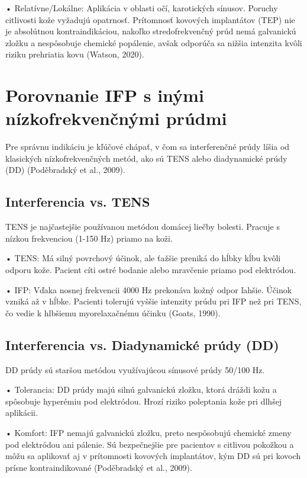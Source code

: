 • Relatívne/Lokálne: Aplikácia v oblasti očí, karotických sínusov. Poruchy citlivosti kože vyžadujú opatrnosť. Prítomnosť kovových implantátov (TEP) nie je absolútnou kontraindikáciou, nakoľko stredofrekvenčný prúd nemá galvanickú zložku a nespôsobuje chemické popálenie, avšak odporúča sa nižšia intenzita kvôli riziku prehriatia kovu (Watson, 2020). 

\section{Porovnanie IFP s inými nízkofrekvenčnými prúdmi}

Pre správnu indikáciu je kľúčové chápať, v čom sa interferenčné prúdy líšia od klasických nízkofrekvenčných metód, ako sú TENS alebo diadynamické prúdy (DD) (Poděbradský et al., 2009). 

\subsection{Interferencia vs. TENS}

TENS je najčastejšie používanou metódou domácej liečby bolesti. Pracuje s nízkou frekvenciou (1-150 Hz) priamo na koži. 

• TENS: Má silný povrchový účinok, ale ťažšie preniká do hĺbky kĺbu kvôli odporu kože. Pacient cíti ostré bodanie alebo mravčenie priamo pod elektródou. 

• IFP: Vďaka nosnej frekvencii 4000 Hz prekonáva kožný odpor ľahšie. Účinok vzniká až v hĺbke. Pacienti tolerujú vyššie intenzity prúdu pri IFP než pri TENS, čo vedie k hlbšiemu myorelaxačnému účinku (Goats, 1990). 

\subsection{Interferencia vs. Diadynamické prúdy (DD)}

DD prúdy sú staršou metódou využívajúcou sínusové prúdy 50/100 Hz. 

• Tolerancia: DD prúdy majú silnú galvanickú zložku, ktorá dráždi kožu a spôsobuje hyperémiu pod elektródou. Hrozí riziko poleptania kože pri dlhšej aplikácii. 

• Komfort: IFP nemajú galvanickú zložku, preto nespôsobujú chemické zmeny pod elektródou ani pálenie. Sú bezpečnejšie pre pacientov s citlivou pokožkou a môžu sa aplikovať aj v prítomnosti kovových implantátov, kým DD sú pri kovoch prísne kontraindikované (Poděbradský et al., 2009). 


